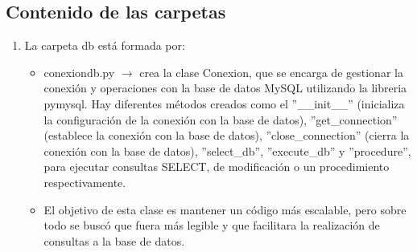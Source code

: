 \documentclass[10pt]{book}
\begin{document}
\subsection{Contenido de las carpetas}
    \begin{enumerate}
        \item La carpeta db está formada por:
            \begin{itemize}
                \item conexiondb.py $\rightarrow$ crea la clase Conexion, que se encarga de gestionar la conexión y operaciones con la base de datos MySQL utilizando la libreria pymysql. Hay diferentes métodos creados como el ''\_\_init\_\_'' (inicializa la configuración de la conexión con la base de datos), ''get\_connection'' (establece la conexión con la base de datos), ''close\_connection'' (cierra la conexión con la base de datos), ''select\_db'', ''execute\_db'' y ''procedure'', para ejecutar consultas SELECT, de modificación o un procedimiento respectivamente.
                \item El objetivo de esta clase es mantener un código más escalable, pero sobre todo se buscó que fuera más legible y que facilitara la realización de consultas a la base de datos.
            \end{itemize}


\end{enumerate}
\end{document}

